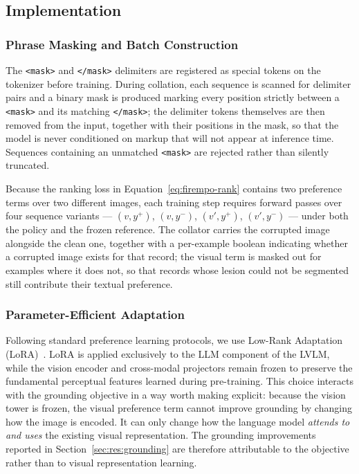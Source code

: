 \subsection{Implementation}
\label{sec:met:implementation}

\subsubsection{Phrase Masking and Batch Construction}

The \texttt{<mask>} and \texttt{</mask>} delimiters are registered as special tokens on the tokenizer before training. During collation, each sequence is scanned for delimiter pairs and a binary mask is produced marking every position strictly between a \texttt{<mask>} and its matching \texttt{</mask>}; the delimiter tokens themselves are then removed from the input, together with their positions in the mask, so that the model is never conditioned on markup that will not appear at inference time. Sequences containing an unmatched \texttt{<mask>} are rejected rather than silently truncated.

Because the ranking loss in Equation~\ref{eq:firempo-rank} contains two preference terms over two different images, each training step requires forward passes over four sequence variants --- $(v, y^+)$, $(v, y^-)$, $(v', y^+)$, $(v', y^-)$ --- under both the policy and the frozen reference. The collator carries the corrupted image alongside the clean one, together with a per-example boolean indicating whether a corrupted image exists for that record; the visual term is masked out for examples where it does not, so that records whose lesion could not be segmented still contribute their textual preference.

\subsubsection{Parameter-Efficient Adaptation}

Following standard preference learning protocols, we use Low-Rank Adaptation (LoRA)~\cite{hu2022lora}. LoRA is applied exclusively to the LLM component of the LVLM, while the vision encoder and cross-modal projectors remain frozen to preserve the fundamental perceptual features learned during pre-training. This choice interacts with the grounding objective in a way worth making explicit: because the vision tower is frozen, the visual preference term cannot improve grounding by changing how the image is encoded. It can only change how the language model \emph{attends to and uses} the existing visual representation. The grounding improvements reported in Section~\ref{sec:res:grounding} are therefore attributable to the objective rather than to visual representation learning.

